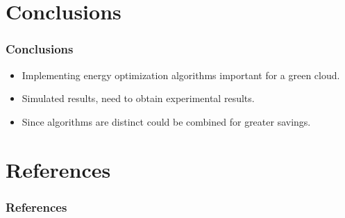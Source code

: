 \documentclass{beamer}
\begin{document}
\section{Conclusions}
\begin{frame}
	\frametitle{Conclusions}
	\begin{itemize}
		\item Implementing energy optimization algorithms important for a green cloud. 
		\linebreak
		\item Simulated results, need to obtain experimental results.
		\linebreak
		\item Since algorithms are distinct could be combined for greater savings.
	\end{itemize}
\end{frame}
\section*{References}

\begin{frame} 
\frametitle{References}
\nocite{*}

{\tiny }
\end{frame} 
\end{document}
